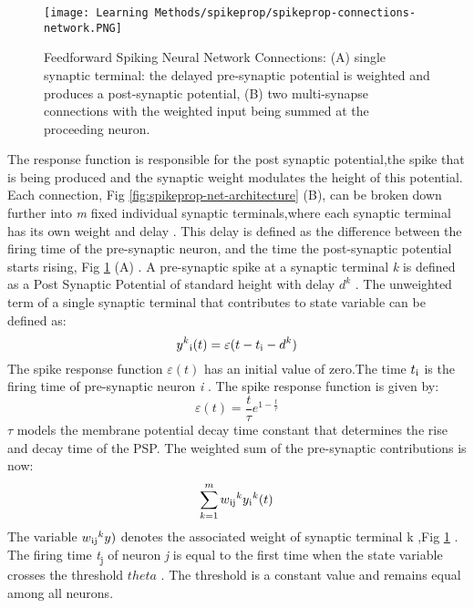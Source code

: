 \documentclass[12pt]{report}
\begin{document}
\begin{figure}[htp]
    \centering
    \texttt{[image: Learning Methods/spikeprop/spikeprop-connections-network.PNG]}
    \caption{Feedforward Spiking Neural Network Connections: (A) single synaptic terminal: the delayed
pre-synaptic potential is weighted and produces a post-synaptic potential, (B)
two multi-synapse connections with the weighted input being summed at the proceeding neuron.}
    \label{fig:spikeprop-connections-network}
\end{figure}
The response function is responsible for the post synaptic potential,the spike that is being produced and the synaptic weight modulates the height of this potential. Each connection, Fig \ref{fig:spikeprop-net-architecture} (B), can be broken down further into \textit{m} fixed individual synaptic terminals,where each synaptic terminal has its own weight and delay . This delay is defined as the difference between the firing time of the
pre-synaptic neuron, and the time the post-synaptic potential starts rising, Fig  \ref{fig:spikeprop-connections-network} (A) . A pre-synaptic spike at a synaptic terminal \textit{k} is defined as a Post Synaptic Potential of standard
height with delay \(d^k\) . The unweighted term of a single synaptic terminal that contributes to state variable can be defined as:
\begin{equation}
    y^k\textsubscript{i}(t) = \varepsilon(t-t\textsubscript{i}-d^k) 
\end{equation}
The spike response function \(\varepsilon(t)\) has an initial value of zero.The time \(t\textsubscript{i}\) is the firing time of pre-synaptic neuron \textit{i} . The spike response function is given by:
\begin{equation}
    \varepsilon(t)=\frac{t}{\tau}e^{1-\frac{t}{\tau}}
\end{equation}
\(\tau\) models the membrane potential decay time constant that determines the rise and decay time of the PSP. The weighted sum of the pre-synaptic contributions is now:
\[ \sum_{k=1}^{m}w\textsubscript{ij}^ky\textsubscript{i}^k(t) \]
The variable \(w\textsubscript{ij}^ky)\) denotes the associated weight of synaptic terminal k ,Fig \ref{fig:spikeprop-connections-network} . The firing time \textit{t}\textsubscript{j} of neuron \textit{j} is equal to the first time when the state variable crosses the threshold \(theta\) . The threshold is a constant value and remains equal among all neurons.
\end{document}
